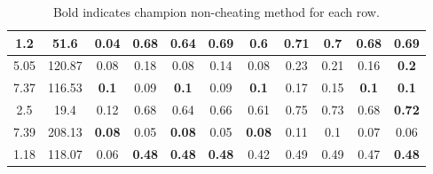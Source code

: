 \begin{table}
{\begin{tabular}{|c|c|c|c|c|c|c|c|c|c|c|}
 \hline 
1.2  &51.6  &0.04  &0.68  &0.64  &\textbf{0.69}
  &0.6  &0.71  &0.7  &0.68  &\textbf{0.69}
  \\
 \hline 
5.05  &120.87  &0.08  &0.18  &0.08  &0.14  &0.08  &0.23  &0.21  &0.16  &\textbf{0.2}
  \\
 \hline 
7.37  &116.53  &\textbf{0.1}
  &0.09  &\textbf{0.1}
  &0.09  &\textbf{0.1}
  &0.17  &0.15  &\textbf{0.1}
  &\textbf{0.1}
  \\
 \hline 
2.5  &19.4  &0.12  &0.68  &0.64  &0.66  &0.61  &0.75  &0.73  &0.68  &\textbf{0.72}
  \\
 \hline 
7.39  &208.13  &\textbf{0.08}
  &0.05  &\textbf{0.08}
  &0.05  &\textbf{0.08}
  &0.11  &0.1  &0.07  &0.06  \\
 \hline 
1.18  &118.07  &0.06  &\textbf{0.48}
  &\textbf{0.48}
  &\textbf{0.48}
  &0.42  &0.49  &0.49  &0.47  &\textbf{0.48}
  \\
 \hline 

\end{tabular}

}
\caption{Bold indicates champion non-cheating method for each row.}

\label{tab:overall}
\end{table}


